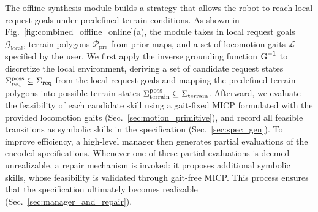 The offline synthesis module builds a strategy that allows the robot to reach local request goals under predefined terrain conditions. As shown in Fig.~\ref{fig:combined_offline_online}(a), the module takes in local request goals $\mathcal{G}_{\textrm{local}}$, terrain polygons $\mathcal{P}_{\text{pre}}$ from prior maps, and a set of locomotion gaits $\mathcal{L}$ specified by the user.
We first apply the inverse grounding function $\textrm{G}^{-1}$ to discretize the local environment, deriving a set of candidate request states $\Sigma_{\textrm{req}}^{\textrm{poss}} \subseteq \Sigma_{\textrm{req}}$ from the local request goals and mapping the predefined terrain polygons into possible terrain states $\Sigma_{\textrm{terrain}}^{\textrm{poss}} \subseteq \Sigma_{\textrm{terrain}}$.
Afterward, we evaluate the feasibility of each candidate skill using a gait-fixed MICP formulated with the provided locomotion gaits (Sec.~\ref{sec:motion_primitive}), and record all feasible transitions as symbolic skills in the specification (Sec.~\ref{sec:spec_gen}).
To improve efficiency, a high-level manager then generates partial evaluations of the encoded specifications. Whenever one of these partial evaluations is deemed unrealizable, a repair mechanism is invoked: it proposes additional symbolic skills, whose feasibility is validated through gait-free MICP. This process ensures that the specification ultimately becomes realizable (Sec.~\ref{sec:manager_and_repair}).



